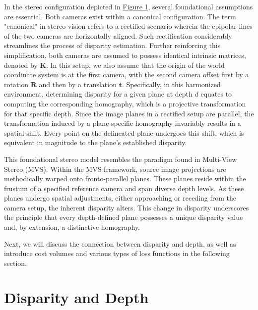 In the stereo configuration depicted in \hyperref[fig:epipolar]{Figure 1}, several foundational assumptions are essential. Both cameras exist within a canonical configuration. The term "canonical" in stereo vision refers to a rectified scenario wherein the epipolar lines of the two cameras are horizontally aligned. Such rectification considerably streamlines the process of disparity estimation. Further reinforcing this simplification, both cameras are assumed to possess identical intrinsic matrices, denoted by $\mathbf{K}$. In this setup, we also assume that the origin of the world coordinate system is at the first camera, with the second camera offset first by a rotation $\mathbf{R}$ and then by a translation $\mathbf{t}$. Specifically, in this harmonized environment, determining disparity for a given plane at depth $d$ equates to computing the corresponding homography, which is a projective transformation for that specific depth. Since the image planes in a rectified setup are parallel, the transformation induced by a plane-specific homography invariably results in a spatial shift. Every point on the delineated plane undergoes this shift, which is equivalent in magnitude to the plane's established disparity.

This foundational stereo model resembles the paradigm found in Multi-View Stereo (MVS). Within the MVS framework, source image projections are methodically warped onto fronto-parallel planes. These planes reside within the frustum of a specified reference camera and span diverse depth levels. As these planes undergo spatial adjustments, either approaching or receding from the camera setup, the inherent disparity alters. This change in disparity underscores the principle that every depth-defined plane possesses a unique disparity value and, by extension, a distinctive homography.

Next, we will discuss the connection between disparity and depth, as well as introduce cost volumes and various types of loss functions in the following section.

\section{Disparity and Depth}\label{sec:depthestim}

